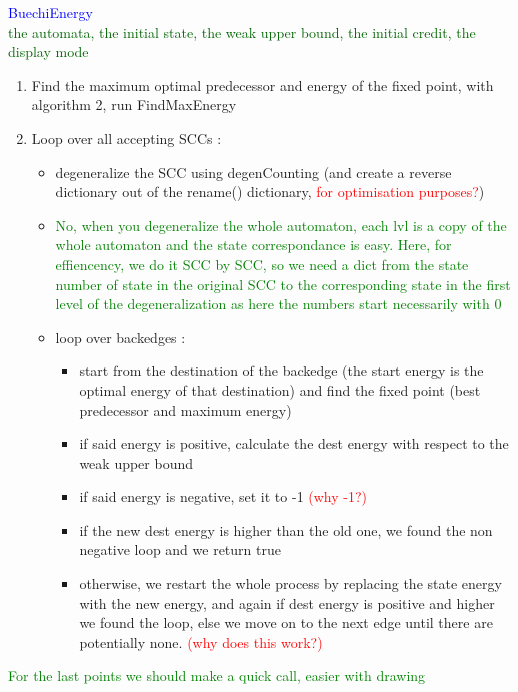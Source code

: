 \documentclass{rapport}
\newcommand{\pscrep}[1]{\textcolor{green}{#1}}
\begin{document}
\textcolor{blue}{BuechiEnergy}\\
\textcolor[HTML]{006400}{the automata, the initial state, the weak upper bound, the initial credit, the display mode}
\begin{enumerate}
    \item Find the maximum optimal predecessor and energy of the fixed point, with algorithm 2, run FindMaxEnergy
    \item Loop over all accepting SCCs :
    \begin{itemize}
        \item degeneralize the SCC using degenCounting (and create a reverse dictionary out of the rename() dictionary, \textcolor{red}{for optimisation purposes?})
        \item \pscrep{No, when you degeneralize the whole automaton, each lvl is a copy of the whole automaton
        and the state correspondance is easy. Here, for effiencency, we do it SCC by SCC, so we need a dict from the
        state number of state in the original SCC to the corresponding state in the first level of the
        degeneralization as here the numbers start necessarily with 0}
        \item loop over backedges :
        \begin{itemize}
            \item start from the destination of the backedge (the start energy is the optimal energy of that destination) and find the fixed point (best predecessor and maximum energy)
            \item if said energy is positive, calculate the dest energy with respect to the weak upper bound
            \item if said energy is negative, set it to -1 \textcolor{red}{(why -1?)}
            \item if the new dest energy is higher than the old one, we found the non negative loop and we return true
            \item otherwise, we restart the whole process by replacing the state energy with the new energy, and again if dest energy is positive and  higher we found the loop, else we move on to the next edge until there are potentially none. \textcolor{red}{(why does this work?)}
        \end{itemize}
    \end{itemize}
\end{enumerate}
\pscrep{For the last points we should make a quick call, easier with drawing}
\newpage
\end{document}
